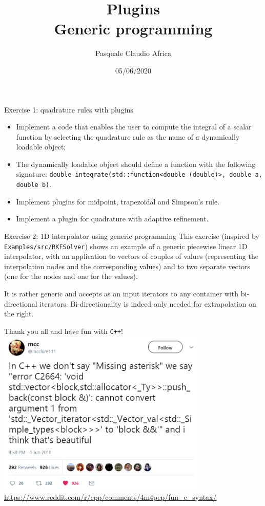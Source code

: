\documentclass[10pt]{beamer}
\begin{document}
    \title{Plugins \protect\\ Generic programming}
    \author{Pasquale Claudio Africa}
    \date{05/06/2020}

\begin{frame}
    \maketitle
\end{frame}

\begin{frame}{Exercise 1: quadrature rules with plugins}
\begin{itemize}
\item Implement a code that enables the user to compute the integral of a scalar function by selecting the quadrature rule as the name of a dynamically loadable object;
\item The dynamically loadable object should define a function with the following signature:
\texttt{double integrate(std::function<double (double)>, double a, double b)}.
\item Implement plugins for midpoint, trapezoidal and Simpson's rule.
\item Implement a plugin for quadrature with adaptive refinement.
\end{itemize}
\end{frame}


\begin{frame}{Exercise 2: 1D interpolator using generic programming}
This exercise (inspired by \texttt{Examples/src/RKFSolver}) shows an example of a generic piecewise linear 1D interpolator, with an application to
vectors of couples of values (representing the interpolation nodes and the corresponding values) and to two separate vectors (one for the nodes and one for the values).

It is rather generic and accepts as an input iterators to any container with bi-directional iterators. Bi-directionality is indeed only needed for extrapolation on the right.
\end{frame}

\begin{frame}{Thank you all and have fun with \texttt{C++}!}
\centering
\includegraphics[width=0.75\textwidth]{meme_c++.png}\\
\url{https://www.reddit.com/r/cpp/comments/4m4pep/fun_c_syntax/}
\end{frame}
\end{document}
